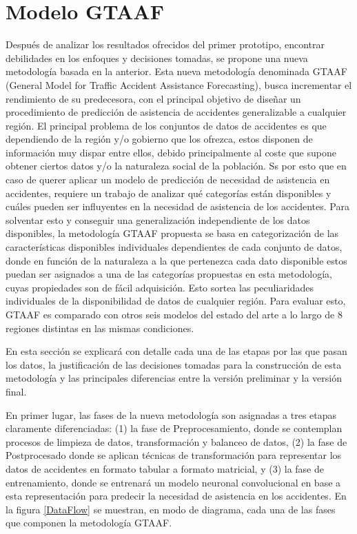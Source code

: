 \documentclass{uathesis-es}
\begin{document}
\section{Modelo GTAAF}
Después de analizar los resultados ofrecidos del primer prototipo, encontrar debilidades en los enfoques y decisiones tomadas, se propone una nueva metodología basada en la anterior. Esta nueva metodología denominada GTAAF (General Model for Traffic Accident Assistance Forecasting), busca incrementar el rendimiento de su predecesora, con el principal objetivo de diseñar un procedimiento de predicción de asistencia de accidentes generalizable a cualquier región. El principal problema de los conjuntos de datos de accidentes es que dependiendo de la región y/o gobierno que los ofrezca, estos disponen de información muy dispar entre ellos, debido principalmente al coste que supone obtener ciertos datos y/o la naturaleza social de la población. Ss por esto que en caso de querer aplicar un modelo de predicción de necesidad de asistencia en accidentes, requiere un trabajo de analizar qué categorías están disponibles y cuáles pueden ser influyentes en la necesidad de asistencia de los accidentes. Para solventar esto y conseguir una generalización independiente de los datos disponibles, la metodología GTAAF propuesta se basa en categorización de las características disponibles individuales dependientes de cada conjunto de datos, donde en función de la naturaleza a la que pertenezca cada dato disponible estos puedan ser asignados a una de las categorías propuestas en esta metodología, cuyas propiedades son de fácil adquisición. Esto sortea las peculiaridades individuales de la disponibilidad de datos de cualquier región. Para evaluar esto, GTAAF es comparado con otros seis modelos del estado del arte a lo largo de 8 regiones distintas en las mismas condiciones.

En esta sección se explicará con detalle cada una de las etapas por las que pasan los datos, la justificación de las decisiones tomadas para la construcción de esta metodología y las principales diferencias entre la versión preliminar y la versión final.

En primer lugar, las fases de la nueva metodología son asignadas a tres etapas claramente diferenciadas: (1) la fase de Preprocesamiento, donde se contemplan procesos de limpieza de datos, transformación y balanceo de datos, (2) la fase de Postprocesado donde se aplican técnicas de transformación para representar los datos de accidentes en formato tabular a formato matricial, y (3) la fase de entrenamiento, donde se entrenará un modelo neuronal convolucional en base a esta representación para predecir la necesidad de asistencia en los accidentes. En la figura \ref{DataFlow} se muestran, en modo de diagrama, cada una de las fases que componen la metodología GTAAF.
\end{document}
